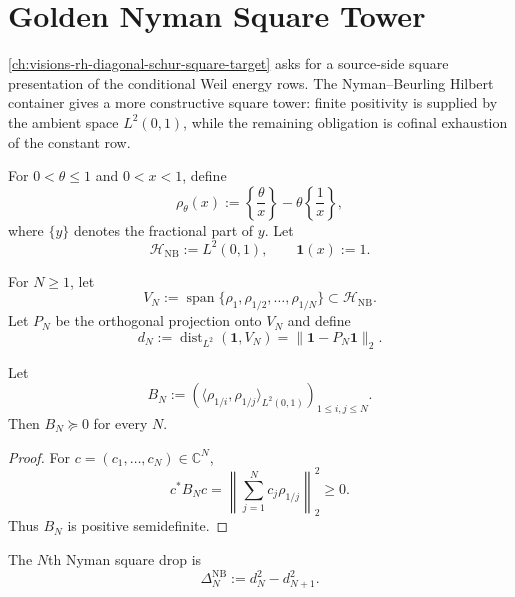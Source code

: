 \chapter{Golden Nyman Square Tower}
\label{ch:visions-rh-golden-nyman-square-tower}

\autoref{ch:visions-rh-diagonal-schur-square-target} asks for a
source-side square presentation of the conditional Weil energy rows.
The Nyman--Beurling Hilbert container gives a more constructive square
tower: finite positivity is supplied by the ambient space
$L^2(0,1)$, while the remaining obligation is cofinal exhaustion of the
constant row.

\begin{definition}
\label{def:rh-nyman-beurling-generator}
For $0<\theta\le1$ and $0<x<1$, define
$$
\rho_\theta(x)
:=
\left\{\frac{\theta}{x}\right\}
-
\theta\left\{\frac{1}{x}\right\},
$$
where $\{y\}$ denotes the fractional part of $y$.  Let
$$
\mathcal H_{\mathrm{NB}}:=L^2(0,1),
\qquad
\mathbf 1(x):=1.
$$
\end{definition}

\begin{definition}
\label{def:rh-finite-nyman-hilbert-container}
For $N\ge1$, let
$$
V_N
:=
\operatorname{span}\{\rho_1,\rho_{1/2},\ldots,\rho_{1/N}\}
\subset \mathcal H_{\mathrm{NB}}.
$$
Let $P_N$ be the orthogonal projection onto $V_N$ and define
$$
d_N
:=
\operatorname{dist}_{L^2}(\mathbf 1,V_N)
=
\|\mathbf 1-P_N\mathbf 1\|_2.
$$
\end{definition}

\begin{theorem}
\label{thm:rh-finite-nyman-gram-positivity}
Let
$$
B_N:=
\left(
\langle \rho_{1/i},\rho_{1/j}\rangle_{L^2(0,1)}
\right)_{1\le i,j\le N}.
$$
Then $B_N\succeq0$ for every $N$.
\end{theorem}

\begin{proof}
For $c=(c_1,\ldots,c_N)\in\mathbb C^N$,
$$
c^\ast B_Nc
=
\left\|
\sum_{j=1}^N c_j\rho_{1/j}
\right\|_2^2
\ge0.
$$
Thus $B_N$ is positive semidefinite.
\end{proof}

\begin{definition}
\label{def:rh-nyman-square-drop}
The $N$th Nyman square drop is
$$
\Delta_N^{\mathrm{NB}}
:=
d_N^2-d_{N+1}^2.
$$
\end{definition}

